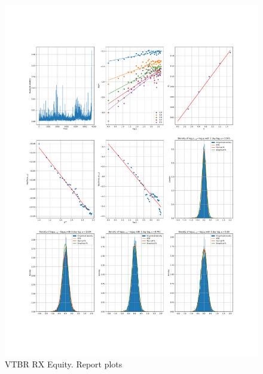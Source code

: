     \begin{figure}[h]
        \centering
        \includegraphics[width=\textwidth]{fig/VTBR RX Equity.pdf}
        \caption{VTBR RX Equity. Report plots}
    \end{figure} 
        
